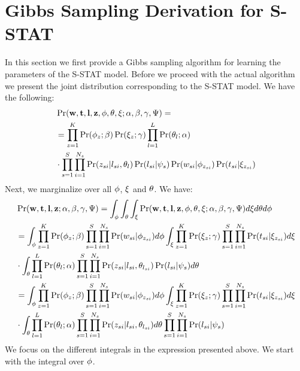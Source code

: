 \documentclass{sig-alternate}
\newcommand{\model}{{S-STAT}\xspace} %
\newcommand{\w}{{\bf w}}
\newcommand{\z}{{\bf z}}
\newcommand{\loc}{{\bf l}}
\newcommand{\tim}{{\bf t}}
\begin{document}
\section{Gibbs Sampling Derivation for \model}
\label{sec:gibbs}
In this section we first provide a Gibbs sampling algorithm for learning the parameters of the \model model. Before we proceed with the actual algorithm we present the joint distribution corresponding to the \model model. We have the following:
{\scriptsize
\begin{align}
&\Pr(\w,\tim,\loc,\z,{\bf \phi},{\bf \theta},{\bf \xi};\alpha,\beta,\gamma,\Psi) =  \nonumber \\
&=\prod_{z = 1}^{K}\Pr(\phi_z;\beta)\Pr(\xi_z;\gamma) \prod_{l = 1}^{L}\Pr(\theta_l;\alpha) \nonumber \\
& \cdot \prod_{s = 1}^{S}\prod_{i = 1}^{N_s} \Pr(z_{si}|l_{si},\theta_l)\Pr(l_{si}|\psi_s)\Pr(w_{si}|\phi_{z_{si}})\Pr(t_{si}|\xi_{z_{si}}) \nonumber
\end{align}}
Next, we marginalize over all ${\bf \phi}$, ${\bf \xi}$ and ${\bf \theta}$. We have:
{\scriptsize
\begin{align}
&\Pr(\w,\tim,\loc,\z;\alpha,\beta,\gamma,\Psi) =  \int_{\phi}\int_{\theta}\int_{\xi} \Pr(\w,\tim,\loc,\z,{\bf \phi},{\bf \theta},{\bf \xi};\alpha,\beta,\gamma,\Psi) d\xi d\theta d\phi \nonumber \\
&=\int_{\phi} \prod_{z = 1}^{K}\Pr(\phi_z;\beta) \prod_{s = 1}^{S}\prod_{i = 1}^{N_s}\Pr(w_{si}|\phi_{z_{si}}) d\phi \int_{\xi} \prod_{z = 1}^{K} \Pr(\xi_z;\gamma)\prod_{s = 1}^{S}\prod_{i = 1}^{N_s}\Pr(t_{si}|\xi_{z_{si}}) d\xi \nonumber \\
&\cdot \int_{\theta} \prod_{l = 1}^{L}\Pr(\theta_l;\alpha)\prod_{s = 1}^{S}\prod_{i = 1}^{N_s}\Pr(z_{si}|l_{si},\theta_{l_{si}})\Pr(l_{si}|\psi_s) d\theta \nonumber \\
&=\int_{\phi} \prod_{z = 1}^{K}\Pr(\phi_z;\beta) \prod_{s = 1}^{S}\prod_{i = 1}^{N_s}\Pr(w_{si}|\phi_{z_{si}}) d\phi \int_{\xi} \prod_{z = 1}^{K} \Pr(\xi_z;\gamma)\prod_{s = 1}^{S}\prod_{i = 1}^{N_s}\Pr(t_{si}|\xi_{z_{si}}) d\xi \nonumber \\
&\cdot \int_{\theta} \prod_{l = 1}^{L}\Pr(\theta_l;\alpha)\prod_{s = 1}^{S}\prod_{i = 1}^{N_s}\Pr(z_{si}|l_{si},\theta_{l_{si}}) d\theta \prod_{s = 1}^{S}\prod_{i = 1}^{N_s} \Pr(l_{si}|\psi_s)\nonumber
\end{align}
}
We focus on the different integrals in the expression presented above. We start with the integral over ${\bf \phi}$. 
\end{document}
